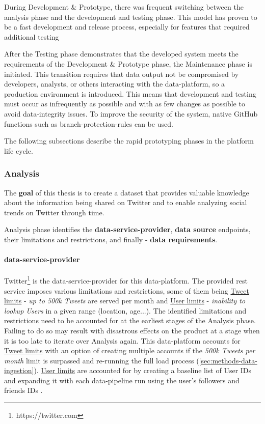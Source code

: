 During Development \& Prototype, there was frequent switching between the analysis phase and the development and testing phase. This model has proven to be a fast development and release process, especially for features that required additional testing 

After the Testing phase demonstrates that the developed system meets the requirements of the Development \& Prototype phase, the Maintenance phase is initiated. This transition requires that data output not be compromised by developers, analysts, or others interacting with the \gls{data-platform}, so a production environment is introduced. This means that development and testing must occur as infrequently as possible and with as few changes as possible to avoid \gls{data-integrity} issues. To improve the security of the system, native GitHub functions such as \gls{branch-protection-rules} can be used.

The following subsections describe the rapid prototyping phases in the platform life cycle.

\vspace{1.2cm}
\subsubsection{Analysis}
\label{subsec:sdlc-analysis}

The \textbf{goal} of this thesis is to create a dataset that provides valuable knowledge about the information being shared on Twitter and to enable analyzing social trends on Twitter through time.

Analysis phase identifies the \textbf{\gls{data-service-provider}}, \textbf{data source} endpoints, their limitations and restrictions, and finally - \textbf{data requirements}.

\paragraph{\Gls{data-service-provider}} Twitter\footnote{https://twitter.com} is the \gls{data-service-provider} for this \gls{data-platform}. The provided \acrshort{rest} service imposes various limitations and restrictions, some of them being \underline{Tweet limits} - \textit{up to 500k Tweets} are served per month and \underline{User limits} - \textit{inability to lookup Users} in a given range (location, age...). The identified limitations and restrictions need to be accounted for at the earliest stages of the Analysis phase. Failing to do so may result with disastrous effects on the product at a stage when it is too late to iterate over Analysis again. This \gls{data-platform} accounts for \underline{Tweet limits} with an option of creating multiple accounts if the \textit{500k Tweets per month} limit is surpassed and re-running the full load process (\ref{sec:methods-data-ingestion}). \underline{User limits} are accounted for by creating a baseline list of User IDs and \textit{}{expanding} it with each \gls{data-pipeline} run \textit{}{using the user's followers and friends IDs} \cite{mipro2022c19prediction}.

